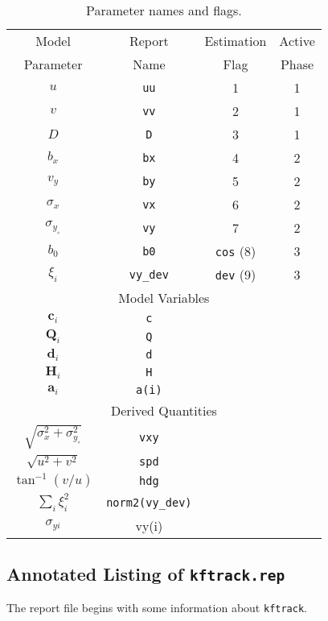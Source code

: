 \documentclass[12pt,draft,titlepage,twoside]{article}
\def\ybull{y_\circ}
\def\kftrack{\texttt{kftrack}}
\begin{document}
\begin{table}
\begin{center}
{\renewcommand{\baselinestretch}{1.3}\small\normalsize
\caption {Parameter names and flags.}
\medskip
\begin{tabular}{|c|c|c|c|}
\hline
Model     & Report & Estimation & Active\\
Parameter & Name   & Flag       & Phase\\
\hline
$u$ & \texttt{uu} & 1 & 1\\
$v$ & \texttt{vv} & 2 & 1\\
$D$ &  \texttt{D} & 3 & 1\\
$b_x$ & \texttt{bx} & 4 & 2\\ 
$v_y$ & \texttt{by} & 5 & 2\\
$\sigma_x$ & \texttt{vx} & 6 & 2\\
$\sigma_{\ybull}$ & \texttt{vy} & 7 &2\\
$b_0$ & \texttt{b0} & \texttt{cos} (8) & 3\\
$\xi_i$ & \texttt{vy\_dev} & \texttt{dev} (9) & 3\\
\hline
\multicolumn{4}{|c|}{Model Variables}\\
\hline
$\mathbf{c}_i$ & \texttt{c} & &\\
$\mathbf{Q}_i$ & \texttt{Q} & &\\
$\mathbf{d}_i$ & \texttt{d} & &\\
$\mathbf{H}_i$ & \texttt{H} & &\\
$\mathbf{a}_i$ & \texttt{a(i)}& &\\
\hline
\multicolumn{4}{|c|}{Derived Quantities}\\
\hline
$\sqrt{\sigma_x^2+\sigma^2_{\ybull}}$ & \texttt{vxy} &  &\\
$\sqrt{u^2+v^2}$ & \texttt{spd} &  &\\
$\tan^{-1} (v/u)$ & \texttt{hdg} &  &\\
$\sum_i\xi^2_i$ & \texttt{norm2(vy\_dev)} & &\\
$\sigma_{yi}$ & vy(i) & &\\
\hline
\end{tabular}
\renewcommand{\baselinestretch}{1.0}\small\normalsize
}\end{center}
\label{tab:params}
\end{table}

\subsection{Annotated Listing of \texttt{kftrack.rep}}
The report file begins with some information about \kftrack .
\end{document}
